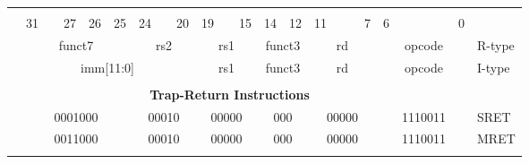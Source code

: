 
\newpage

\begin{table}[p]
\begin{small}
\begin{center}
    \begin{tabular} {p{0.002in}p{0.002in}p{0.002in}p{0.002in}p{0.002in}p{0.002in}p{0.002in}p{0.002in}p{0.002in}p{0.002in}p{0.002in}p{0.002in}p{0.002in}p{0.002in}p{0.002in}p{0.002in}p{0.002in}p{0.002in}p{0.002in}p{0.002in}p{0.002in}p{0.002in}p{0.002in}p{0.002in}p{0.002in}p{0.002in}p{0.002in}p{0.002in}p{0.002in}p{0.002in}p{0.002in}p{0.002in}p{0.002in}l}
    & & & & & & & & & & & & & & & & & & & & & & & & & & & & & & & & \\

            &

    \multicolumn{3}{l}{31} &
    \multicolumn{2}{r}{27} &
    \multicolumn{1}{c}{26} &
    \multicolumn{1}{r}{25} &
    \multicolumn{3}{l}{24} &
    \multicolumn{2}{r}{20} &
    \multicolumn{3}{l}{19} &
    \multicolumn{2}{r}{15} &
    \multicolumn{2}{l}{14} &
    \multicolumn{1}{r}{12} &
    \multicolumn{4}{l}{11} &
    \multicolumn{1}{r}{7} &
    \multicolumn{6}{l}{6} &
    \multicolumn{1}{r}{0} \\
    \cline{2-33}
&


\multicolumn{7}{|c|}{funct7} &
\multicolumn{5}{c|}{rs2} &
\multicolumn{5}{c|}{rs1} &
\multicolumn{3}{c|}{funct3} &
\multicolumn{5}{c|}{rd} &
\multicolumn{7}{|c|}{opcode} & R-type \\
\cline{2-33}
&

\multicolumn{12}{|c|}{imm[11:0]} &
\multicolumn{5}{c|}{rs1} &
\multicolumn{3}{c|}{funct3} &
\multicolumn{5}{c|}{rd} &
\multicolumn{7}{|c|}{opcode} & I-type \\
\cline{2-33}
&




\multicolumn{32}{c}{} & \\
\multicolumn{32}{c}{\bf Trap-Return Instructions } & \\
\cline{2-33}

            &
\multicolumn{7}{|c|}{0001000} &
\multicolumn{5}{c|}{00010} &
\multicolumn{5}{c|}{00000} &
\multicolumn{3}{c|}{000} &
\multicolumn{5}{c|}{00000} &
\multicolumn{7}{|c|}{1110011} & SRET \\
\cline{2-33}
&

\multicolumn{7}{|c|}{0011000} &
\multicolumn{5}{c|}{00010} &
\multicolumn{5}{c|}{00000} &
\multicolumn{3}{c|}{000} &
\multicolumn{5}{c|}{00000} &
\multicolumn{7}{|c|}{1110011} & MRET \\
\cline{2-33}
&





\end{tabular}
\end{center}
\end{small}
\end{table}
